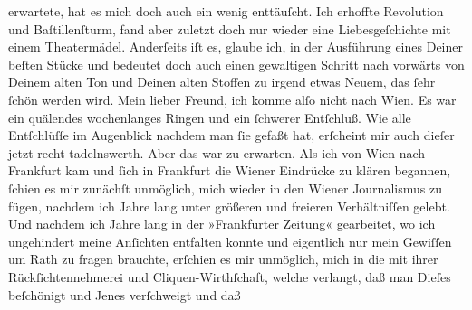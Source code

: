 \begin{ledgroupsized}[t]{13cm}
               erwartete, hat es mich doch auch ein wenig enttäuſcht. Ich erhoffte Revolution und
                  Baſtillenſturm, fand aber zuletzt doch nur
               wieder eine Liebesgeſchichte mit einem Theatermädel. Anderſeits iſt es, glaube ich,
               in der Ausführung eines Deiner beſten Stücke und bedeutet doch \strikeout{\textcolor{gray}{einen}} auch einen gewaltigen Schritt nach vorwärts  von Deinem alten Ton und Deinen alten
               Stoffen zu irgend etwas Neuem, das ſehr ſchön werden wird.\pend
           \pstart
           {\pb}Mein lieber Freund, ich komme alſo nicht nach Wien. Es war ein quälendes wochenlanges Ringen und
               ein ſchwerer Entſchluß. Wie alle Entſchlüſſe im Augenblick nachdem man ſie gefaßt
               hat, erſcheint mir auch dieſer jetzt recht tadelnswerth. Aber das war zu
               erwarten.\pend
           \pstart
           Als ich von Wien nach Frankfurt kam und ſich in Frankfurt die Wiener Eindrücke zu klären
               begannen, ſchien es mir zunächſt unmöglich, mich wieder in den Wiener Journalismus zu fügen, nachdem ich Jahre lang unter
               größeren und freieren Verhältniſſen gelebt. Und nachdem ich Jahre lang in der »Frankfurter Zeitung« gearbeitet, wo ich
               ungehindert meine Anſichten entfalten konnte und eigentlich nur mein Gewiſſen um Rath
               zu fragen brauchte, erſchien es mir unmöglich, mich in die \label{K_L02868-2v}\label{K_L02868-2h} mit ihrer Rückſichtennehmerei und Cliquen-Wirthſchaft, welche verlangt, daß
               man Dieſes beſchönigt und Jenes verſchweigt und daß \label{K_L02868-3v}
\end{ledgroupsized}
